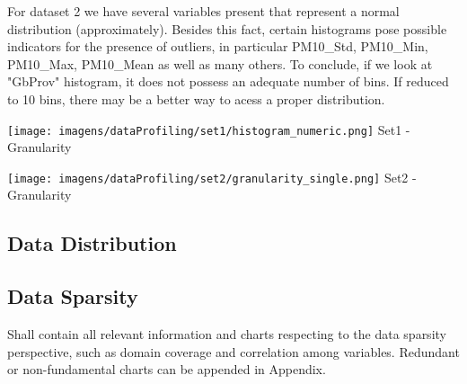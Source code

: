 \documentclass[11pt]{article}
\begin{document}
 For dataset 2 we have several variables present that represent a normal distribution (approximately). Besides this fact, certain histograms pose possible indicators for the presence of outliers, in particular PM10\_Std, PM10\_Min, PM10\_Max, PM10\_Mean as well as many others. To conclude, if we look at "GbProv" histogram, it does not possess an adequate number of bins. If reduced to 10 bins, there may be a better way to acess a proper distribution.


\begin{figure*}[!htp]
    \begin{minipage}[!htp]{.50\textwidth}
        \centering
        \texttt{[image: imagens/dataProfiling/set1/histogram\_numeric.png]}
        Set1 - Granularity
    \end{minipage}\hfill
    \begin{minipage}[!htp]{.40\textwidth}
        \centering
        \texttt{[image: imagens/dataProfiling/set2/granularity\_single.png]}
        Set2 - Granularity
    \end{minipage}\hfill
\end{figure*}


\subsection*{Data Distribution}


\subsection*{Data Sparsity}
\begin{tcolorbox} %
Shall contain all relevant information and charts respecting to the data sparsity perspective, such as domain coverage and correlation among variables. Redundant or non-fundamental charts can be appended in Appendix. 
\end{tcolorbox} %
\end{document}
